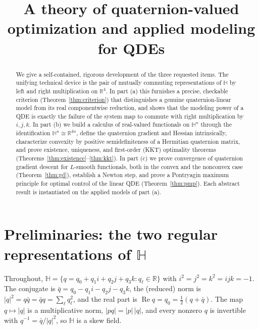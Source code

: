 \documentclass{amsart}
\theoremstyle{definition}
\newcommand{\HH}{\mathbb{H}}
\newcommand{\RR}{\mathbb{R}}
\newcommand{\Real}{\operatorname{Re}}
\begin{document}
\title{A theory of quaternion-valued optimization and applied modeling for QDEs}
\author{}
\date{}
\maketitle

\begin{abstract}
We give a self-contained, rigorous development of the three requested
items. The unifying technical device is the pair of mutually commuting
representations of $\HH$ by left and right multiplication on
$\RR^{4}$. In part (a) this furnishes a precise, checkable criterion
(Theorem~\ref{thm:criterion}) that distinguishes a genuine
quaternion-linear model from its real componentwise reduction, and
shows that the modeling power of a QDE is exactly the failure of the
system map to commute with right multiplication by $i,j,k$. In part (b)
we build a calculus of real-valued functionals on $\HH^{n}$ through the
identification $\HH^{n}\cong\RR^{4n}$, define the quaternion gradient and
Hessian intrinsically, characterize convexity by positive
semidefiniteness of a Hermitian quaternion matrix, and prove existence,
uniqueness, and first-order (KKT) optimality theorems
(Theorems~\ref{thm:existence}--\ref{thm:kkt}). In part (c) we prove
convergence of quaternion gradient descent for $L$-smooth functionals,
both in the convex and the nonconvex case
(Theorem~\ref{thm:gd}), establish a Newton step, and prove a Pontryagin
maximum principle for optimal control of the linear QDE
(Theorem~\ref{thm:pmp}). Each abstract result is instantiated on the
applied models of part (a).
\end{abstract}

\tableofcontents

\section{Preliminaries: the two regular representations of $\HH$}
\label{sec:prelim}

Throughout, $\HH=\{q=q_0+q_1 i+q_2 j+q_3 k:q_\ell\in\RR\}$ with
$i^2=j^2=k^2=ijk=-1$. The conjugate is
$\bar q=q_0-q_1 i-q_2 j-q_3 k$, the (reduced) norm is
$|q|^2=q\bar q=\bar q q=\sum_\ell q_\ell^2$, and the real part is
$\Real q=q_0=\tfrac12(q+\bar q)$. The map $q\mapsto|q|$ is a
multiplicative norm, $|pq|=|p|\,|q|$, and every nonzero $q$ is
invertible with $q^{-1}=\bar q/|q|^2$, so $\HH$ is a skew field.
\end{document}
